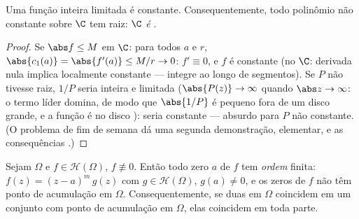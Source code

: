 \begin{corollary}
\label{cor:b3:holomorphic:liouville}
Uma função inteira limitada é constante. Consequentemente, todo
polinômio não constante sobre $\C$ tem raiz: \emph{$\C$ é
}.
\end{corollary}

\begin{proof}
Se $\abs f \leq M$ em $\C$: para todos $a$ e $r$, $\abs{c_1(a)}
= \abs{f'(a)} \leq M/r \to 0$: $f' \equiv 0$, e
$f$ é constante (no  $\C$: derivada nula implica localmente
constante --- integre ao longo de segmentos). Se $P$ não tivesse
raiz, $1/P$ seria inteira e limitada ($\abs{P(z)} \to
\infty$ quando $\abs z \to \infty$: o termo
líder domina, de modo que $\abs{1/P}$ é pequeno fora de um disco grande, e a
função é  no disco ): seria constante --- absurdo para
$P$ não constante. (O problema de fim de semana dá uma segunda
demonstração, elementar, e as consequências .)
\end{proof}

\begin{theorem}
\label{thm:b3:holomorphic:identity}
Sejam $\Omega$ \emph{} e $f \in \mathcal
H(\Omega)$, $f \not\equiv 0$. Então todo zero $a$
de $f$ tem \emph{ordem} finita: $f(z) = (z - a)^m\,g(z)$ com $g \in
\mathcal H(\Omega)$, $g(a) \neq 0$, e os zeros
de $f$ não têm ponto de acumulação em $\Omega$. Consequentemente,
se duas  em $\Omega$ coincidem em um conjunto com
ponto de acumulação em $\Omega$, elas coincidem em toda
parte.
\end{theorem}

